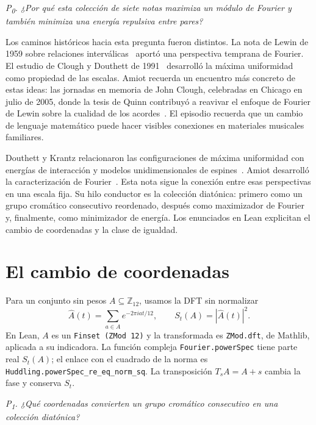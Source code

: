 \documentclass[11pt]{article}
\newcommand{\lean}[1]{\texttt{#1}}
\newcommand{\Ztwelve}{\mathbb{Z}_{12}}
\newcommand{\Ahat}{\widehat A}
\newcommand{\question}[1]{\smallskip\noindent\textit{#1}\smallskip}
\begin{document}
\question{P\textsubscript{0}. ¿Por qué esta colección de siete notas maximiza un módulo
de Fourier y también minimiza una energía repulsiva entre pares?}

Los caminos históricos hacia esta pregunta fueron distintos. La nota de Lewin de 1959
sobre relaciones interválicas~\cite{Lewin} aportó una perspectiva temprana de Fourier.
El estudio de Clough y Douthett de 1991~\cite{CloughDouthett} desarrolló la máxima
uniformidad como propiedad de las escalas. Amiot recuerda un encuentro más concreto de
estas ideas: las jornadas en memoria de John Clough, celebradas en Chicago en julio de
2005, donde la tesis de Quinn contribuyó a reavivar el enfoque de Fourier de Lewin
sobre la cualidad de los acordes~\cite{Amiot2009}. El episodio recuerda que un cambio de
lenguaje matemático puede hacer visibles conexiones en materiales musicales familiares.

Douthett y Krantz relacionaron las configuraciones de máxima uniformidad con energías de
interacción y modelos unidimensionales de espines~\cite{DK}. Amiot desarrolló la
caracterización de Fourier~\cite{Amiot2007}. Esta nota sigue la conexión entre esas
perspectivas en una escala fija. Su hilo conductor es la colección diatónica: primero
como un grupo cromático consecutivo reordenado, después como maximizador de Fourier y,
finalmente, como minimizador de energía. Los enunciados en Lean explicitan el cambio
de coordenadas y la clase de igualdad.

\section{El cambio de coordenadas}\label{sec:coordinates}

Para un conjunto sin pesos $A\subseteq\Ztwelve$, usamos la DFT sin normalizar
\begin{equation}\label{eq:dft}
  \Ahat(t)=\sum_{a\in A}e^{-2\pi i at/12},\qquad
  S_t(A)=|\Ahat(t)|^2.
\end{equation}
En Lean, $A$ es un \lean{Finset (ZMod 12)} y la transformada es \lean{ZMod.dft}, de
Mathlib, aplicada a su indicadora. La función compleja \lean{Fourier.powerSpec} tiene
parte real $S_t(A)$; el enlace con el cuadrado de la norma es
\lean{Huddling.powerSpec\_re\_eq\_norm\_sq}.
La transposición $T_sA=A+s$ cambia la fase y conserva $S_t$.

\question{P\textsubscript{1}. ¿Qué coordenadas convierten un grupo cromático consecutivo
en una colección diatónica?}
\end{document}
